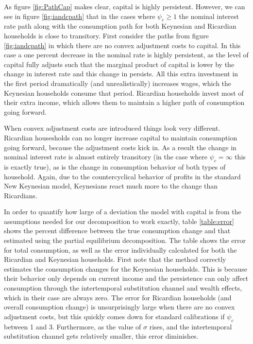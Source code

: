 \documentclass[12pt,a4paper]{article}
\begin{document}
As figure \ref{fig:PathCap} makes clear, capital is highly persistent. However, we can see in figure \ref{fig:iandcpath} that in the cases where $\psi_c \geq 1$ the nominal interest rate path along with the consumption path for both Keynesian and Ricardian households is close to transitory. First consider the paths from figure \ref{fig:iandcpath} in which there are no convex adjustment costs to capital. In this case a one percent decrease in the nominal rate is highly persistent, as the level of capital fully adjusts such that the marginal product of capital is lower by the change in interest rate and this change in persists. All this extra investment in the first period dramatically (and unrealistically) increases wages, which the Keynesian households consume that period. Ricardian households invest most of their extra income, which allows them to maintain a higher path of consumption going forward.

When convex adjustment costs are introduced things look very different. Ricardian housesholds can no longer increase capital to maintain consumption going forward, because the adjustment costs kick in. As a result the change in nominal interest rate is almost entirely transitory (in the case where $\psi_c=\infty$ this is exactly true), as is the change in consumption behavior of both types of household. Again, due to the countercyclical behavior of profits in the standard New Keynesian model, Keynesians react much more to the change than Ricardians.

In order to quantify how large of a deviation the model with capital is from the assumptions needed for our decomposition to work exactly, table \ref{table:error} shows the percent difference between the true consumption change and that estimated using the partial equilibrium decomposition. The table shows the error for total consumption, as well as the error individually calculated for both the Ricardian and Keynesian households. First note that the method correctly estimates the consumption changes for the Keynesian households. This is because their behavior only depends on current income and the persistence can only affect consumption through the intertemporal substitution channel and wealth effects, which in their case are always zero. The error for Ricardian households (and overall consumption change) is unsurprisingly large when there are no convex adjustment costs, but this quickly comes down for standard calibrations if $\psi_c$ between 1 and 3. Furthermore, as the value of $\sigma$ rises, and the intertemporal substitution channel gets relatively smaller, this error diminishes.
\end{document}
